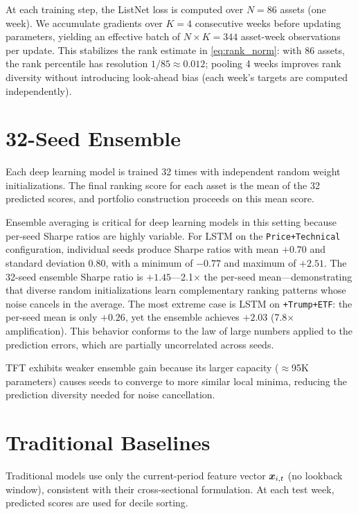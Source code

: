 At each training step, the ListNet loss is computed over $N = 86$ assets
(one week).
We accumulate gradients over $K = 4$ consecutive weeks before updating
parameters, yielding an effective batch of $N \times K = 344$ asset-week
observations per update.
This stabilizes the rank estimate in \cref{eq:rank_norm}: with 86 assets,
the rank percentile has resolution $1/85 \approx 0.012$; pooling 4 weeks
improves rank diversity without introducing look-ahead bias (each week's
targets are computed independently).

\section{32-Seed Ensemble}
\label{sec:method:ensemble}

Each deep learning model is trained 32 times with independent random
weight initializations.
The final ranking score for each asset is the mean of the 32 predicted
scores, and portfolio construction proceeds on this mean score.

Ensemble averaging is critical for deep learning models in this setting
because per-seed Sharpe ratios are highly variable.
For LSTM on the \texttt{Price+Technical} configuration, individual seeds
produce Sharpe ratios with mean $+0.70$ and standard deviation $0.80$,
with a minimum of $-0.77$ and maximum of $+2.51$.
The 32-seed ensemble Sharpe ratio is $+1.45$—2.1$\times$ the per-seed
mean—demonstrating that diverse random initializations learn
complementary ranking patterns whose noise cancels in the average.
The most extreme case is LSTM on \texttt{+Trump+ETF}: the per-seed mean
is only $+0.26$, yet the ensemble achieves $+2.03$ (7.8$\times$
amplification).
This behavior conforms to the law of large numbers applied to the
prediction errors, which are partially uncorrelated across seeds.

TFT exhibits weaker ensemble gain because its larger capacity ($\approx$95K
parameters) causes seeds to converge to more similar local minima,
reducing the prediction diversity needed for noise cancellation.

\section{Traditional Baselines}
\label{sec:method:baselines}

Traditional models use only the current-period feature vector $\bm{x}_{i,t}$
(no lookback window), consistent with their cross-sectional formulation.
At each test week, predicted scores are used for decile sorting.


